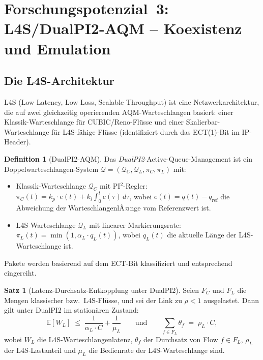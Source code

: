 ﻿\documentclass[a4paper,12pt]{article}
\theoremstyle{definition}
\newtheorem{definition}{Definition}
\newtheorem{satz}{Satz}
\begin{document}
\section{Forschungspotenzial~3: L4S/DualPI2-AQM -- Koexistenz und Emulation}

\subsection{Die L4S-Architektur}

L4S (Low Latency, Low Loss, Scalable Throughput) \cite{briscoe2023l4s} ist eine
Netzwerkarchitektur, die auf zwei gleichzeitig operierenden AQM-Warteschlangen
basiert: einer Klassik-Warteschlange f\"{u}r CUBIC/Reno-Fl\"{u}sse und einer
Skalierbar-Warteschlange f\"{u}r L4S-f\"{a}hige Fl\"{u}sse (identifiziert durch das
ECT(1)-Bit im IP-Header).

\begin{definition}[DualPI2-AQM]
    Das \emph{DualPI2}-Active-Queue-Management ist ein Doppelwarteschlangen-System
    $\mathcal{Q} = (\mathcal{Q}_C, \mathcal{Q}_L, \pi_C, \pi_L)$ mit:
    \begin{itemize}
        \item Klassik-Warteschlange $\mathcal{Q}_C$ mit PI$^2$-Regler:
              $\pi_C(t) = k_p \cdot e(t) + k_i \int_0^t e(\tau)\,d\tau$,
              wobei $e(t) = q(t) - q_{\mathrm{ref}}$ die Abweichung der
              WarteschlangenlÃ¤nge vom Referenzwert ist.
        \item L4S-Warteschlange $\mathcal{Q}_L$ mit linearer Markierungsrate:
              $\pi_L(t) = \min(1, \alpha_L \cdot q_L(t))$, wobei $q_L(t)$
              die aktuelle L\"{a}nge der L4S-Warteschlange ist.
    \end{itemize}
    Pakete werden basierend auf dem ECT-Bit klassifiziert und entsprechend
    eingereiht.
\end{definition}

\begin{satz}[Latenz-Durchsatz-Entkopplung unter DualPI2]
    \label{satz:dualpi2}
    Seien $F_C$ und $F_L$ die Mengen klassischer bzw.\ L4S-Fl\"{u}sse, und sei
    der Link zu $\rho < 1$ ausgelastet. Dann gilt unter DualPI2 im station\"{a}ren
    Zustand:
    \[
        \mathbb{E}[W_L] \;\leq\; \frac{1}{\alpha_L \cdot C} + \frac{1}{\mu_L}
        \qquad \text{und} \qquad
        \sum_{f \in F_L} \theta_f \;=\; \rho_L \cdot C,
    \]
    wobei $W_L$ die L4S-Warteschlangenlatenz, $\theta_f$ der Durchsatz von
    Flow $f \in F_L$, $\rho_L$ der L4S-Lastanteil und $\mu_L$ die
    Bedienrate der L4S-Warteschlange sind.
\end{satz}
\end{document}
